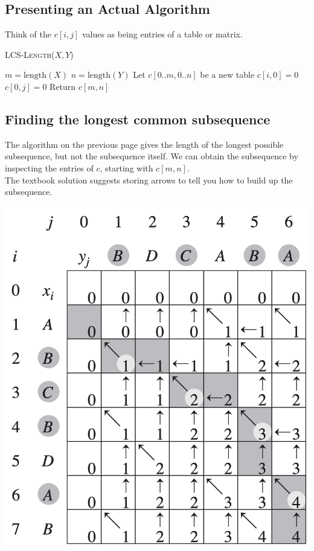 \documentclass[11  pt]{article}
\begin{document}
\pagebreak

\subsection{Presenting an Actual Algorithm}
Think of the $c[i,j]$ values as being entries of a table or matrix.

\vspace{10cm}

%

\begin{algorithm}
	\textsc{LCS-Length}($X,Y$)
	\begin{algorithmic}
		\State $m = \text{length}(X)$
		\State $n = \text{length}(Y)$
		\State Let $c[0..m, 0..n]$ be a new table
		\State $c[i,0] = 0$
		\EndFor
		\State $c[0,j] = 0$
		\EndFor
		\State 
		\State
		\Else 
		\State 
		\State
		\EndIf
		\EndFor
		\EndFor
		\State Return $c[m,n]$
	\end{algorithmic}
\end{algorithm}

\newpage


\subsection{Finding the longest common subsequence}
The algorithm on the previous page gives the length of the longest possible subsequence, but not the subsequence itself. We can obtain the subsequence by inspecting the entries of $c$, starting with $c[m,n]$.\\

The textbook solution suggests storing arrows to tell you how to build up the subsequence.

\vs{2cm}

\includegraphics[width=.75\linewidth]{table}\\
\end{document}

